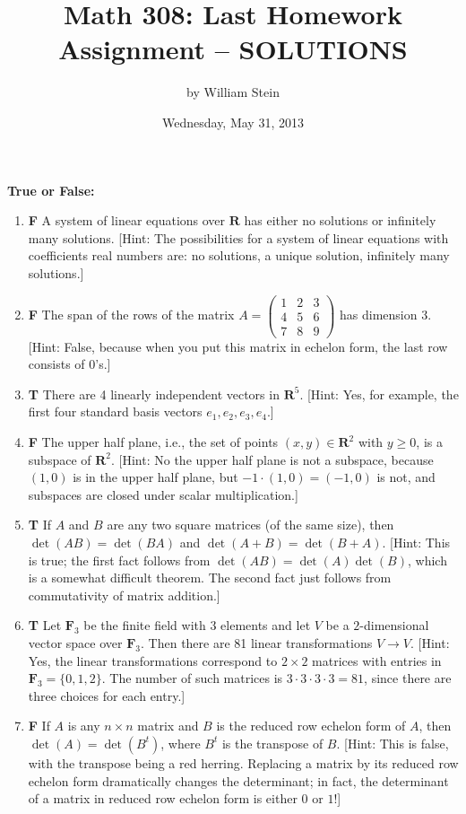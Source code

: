 \documentclass[10pt]{article}
\title{\color{blue}\bf Math 308: Last Homework Assignment -- SOLUTIONS}
\date{Wednesday, May 31, 2013}
\author{by William Stein}
\newcommand{\tf}[3]{\item {\bf {\color{blue}\hspace{1em}#1}}\hspace{1em} #2 [Hint: #3]}
\newcommand{\R}{\mathbf{R}}
\newcommand{\F}{\mathbf{F}}
\begin{document}
\maketitle

{\noindent\bf \color{red} True or False:}
\begin{enumerate}

\tf{F}{A system of linear equations over $\R$ has either no solutions or infinitely many solutions.}{The possibilities for a system
of linear equations with coefficients real numbers are: no solutions, a unique solution, infinitely many solutions.}

\tf{F}{The span of the rows of the matrix $A=\left(\begin{array}{rrr}
1 & 2 & 3 \\
4 & 5 & 6 \\
7 & 8 & 9
\end{array}\right)$ has dimension 3.}{False, because when you put this matrix in echelon form, the last row consists of 0's.}

\tf{T}{There are 4 linearly independent vectors in $\R^5$.}{Yes, for example, the first four standard basis vectors
$e_1, e_2, e_3, e_4$.}

\tf{F}{The upper half plane, i.e., the set of points $(x,y) \in \R^2$ with $y\geq 0$, is a subspace of $\R^2$.}{No the
upper half plane is not a subspace, because $(1,0)$ is in the upper half plane, but $-1 \cdot (1,0) = (-1,0)$ is not,
and subspaces are closed under scalar multiplication.}

\tf{T}{If $A$ and $B$ are any two square matrices (of the same size), then $\det(AB)=\det(BA)$ and $\det(A+B)=\det(B+A)$.}{This
is true; the first fact follows from $\det(AB)=\det(A)\det(B)$, which is a somewhat difficult theorem.  The second fact just
follows from commutativity of matrix addition.}

\tf{T}{Let $\F_3$ be the finite field with $3$ elements and let $V$ be a $2$-dimensional
    vector space over $\F_3$.  Then there are 81 linear transformations $V\to V$.}{Yes, the linear
    transformations correspond to $2\times 2$ matrices with entries in $\F_3=\{0,1,2\}$.  The
    number of such matrices is $3\cdot 3 \cdot 3 \cdot 3= 81$, since there are three choices
    for each entry.}

\tf{F}{If $A$ is any $n\times n$ matrix and $B$ is the reduced row echelon form of $A$, then $\det(A)=\det(B^t)$, where
$B^t$ is the transpose of $B$.}{This is false, with the transpose being a red herring.  Replacing a matrix by its reduced
row echelon form dramatically changes the determinant; in fact, the determinant of a matrix in reduced row echelon form
is either $0$ or $1$!}


\end{enumerate}
\end{document}
